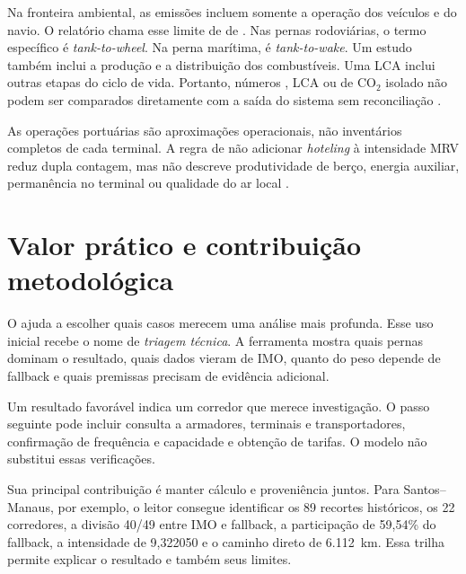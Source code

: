 Na fronteira ambiental, as emissões incluem somente a operação dos veículos e do navio. O relatório chama esse limite de \ttw{} de \cooe{}. Nas pernas rodoviárias, o termo específico é \emph{tank-to-wheel}. Na perna marítima, é \emph{tank-to-wake}. Um estudo \wtw{} também inclui a produção e a distribuição dos combustíveis. Uma LCA inclui outras etapas do ciclo de vida. Portanto, números \wtw{}, LCA ou de CO$_2$ isolado não podem ser comparados diretamente com a saída do sistema sem reconciliação \cite{decarb2024,maritimelca2024}.

As operações portuárias são aproximações operacionais, não inventários completos de cada terminal. A regra de não adicionar \emph{hoteling} à intensidade MRV reduz dupla contagem, mas não descreve produtividade de berço, energia auxiliar, permanência no terminal ou qualidade do ar local \cite{berth2009,shipops2022,berthairquality2010}.

\section{Valor prático e contribuição metodológica}
\label{sec:valor-pratico-triagem}

O \CabotageLens{} ajuda a escolher quais casos merecem uma análise mais profunda. Esse uso inicial recebe o nome de \emph{triagem técnica}. A ferramenta mostra quais pernas dominam o resultado, quais dados vieram de IMO, quanto do peso depende de fallback e quais premissas precisam de evidência adicional.

Um resultado favorável indica um corredor que merece investigação. O passo seguinte pode incluir consulta a armadores, terminais e transportadores, confirmação de frequência e capacidade e obtenção de tarifas. O modelo não substitui essas verificações.

Sua principal contribuição é manter cálculo e proveniência juntos. Para Santos--Manaus, por exemplo, o leitor consegue identificar os 89 recortes históricos, os 22 corredores, a divisão 40/49 entre IMO e fallback, a participação de 59,54\% do fallback, a intensidade de 9,322050 e o caminho direto de 6.112~km. Essa trilha permite explicar o resultado e também seus limites.
